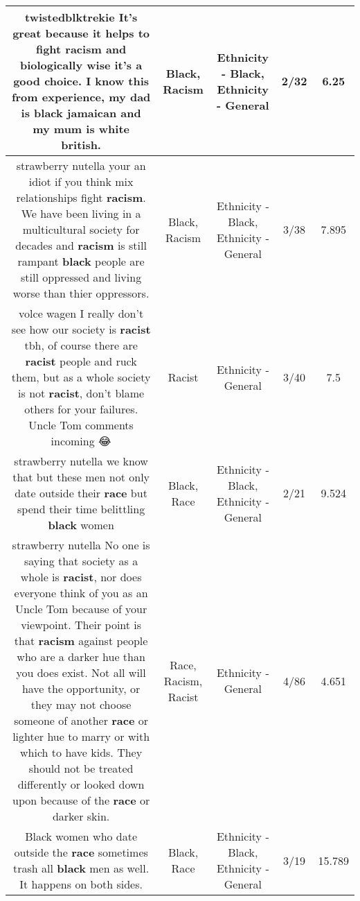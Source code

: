 \documentclass[11pt]{article}
\newlength\mylength
\begin{document}
\begin{center}
\begin{longtable}{|C{.65\mylength}|C{.30\mylength}|C{.12\mylength}|C{.12\mylength}|C{.12\mylength}|}
  \small twistedblktrekie It's great because it helps to fight \textbf{racism} and biologically wise it's a good choice. I know this from experience, my dad is \textbf{black} jamaican and my mum is white british.\normalsize   & Black, Racism & Ethnicity - Black, Ethnicity - General & 2/32 & 6.25 \\  \hline
  \small strawberry nutella your an idiot if you think mix relationships fight \textbf{racism}. We have been living in a multicultural society for decades and \textbf{racism} is still rampant \textbf{black} people are still oppressed and living worse than thier oppressors.\normalsize   & Black, Racism & Ethnicity - Black, Ethnicity - General & 3/38 & 7.895 \\  \hline
  \small volce wagen I really don't see how our society is \textbf{racist} tbh, of course there are \textbf{racist} people and ruck them, but as a whole society is not \textbf{racist}, don't blame others for your failures. Uncle Tom comments incoming 😂\normalsize   & Racist & Ethnicity - General & 3/40 & 7.5 \\  \hline
  \small strawberry nutella we know that but these men not only date outside their \textbf{race} but spend their time belittling \textbf{black} women\normalsize   & Black, Race & Ethnicity - Black, Ethnicity - General & 2/21 & 9.524 \\  \hline
  \small strawberry nutella No one is saying that society as a whole is \textbf{racist}, nor does everyone think of you as an Uncle Tom because of your viewpoint.  Their point is that \textbf{racism} against people who are a darker hue than you does exist.  Not all will have the opportunity, or they may not choose someone of another \textbf{race} or lighter hue to marry or with which to have kids.  They should not be treated differently or looked down upon because of the \textbf{race} or darker skin.\normalsize   & Race, Racism, Racist & Ethnicity - General & 4/86 & 4.651 \\  \hline
  \small Black women who date outside the \textbf{race} sometimes trash all \textbf{black} men as well. It happens on both sides.\normalsize   & Black, Race & Ethnicity - Black, Ethnicity - General & 3/19 & 15.789 \\  \hline

\end{longtable}
\end{center}
\end{document}
